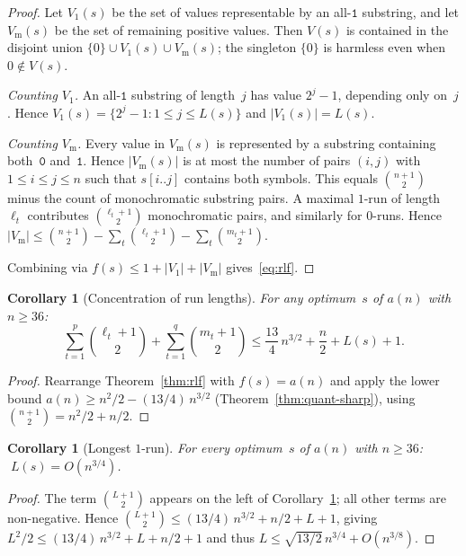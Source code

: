 \documentclass[11pt,a4paper]{article}
\theoremstyle{plain}
\newtheorem{corollary}[theorem]{Corollary}
\theoremstyle{definition}
\theoremstyle{remark}
\begin{document}
\begin{proof}
  Let $V_1(s)$ be the set of values representable by an
  all-$\mathtt{1}$ substring, and let $V_{\mathrm{m}}(s)$ be the set
  of remaining positive values.  Then $V(s)$ is contained in the
  disjoint union $\{0\} \cup V_1(s) \cup V_{\mathrm{m}}(s)$; the
  singleton $\{0\}$ is harmless even when $0 \notin V(s)$.

  \textit{Counting $V_1$.}
  An all-$\mathtt{1}$ substring of length~$j$ has value $2^j - 1$,
  depending only on~$j$.  Hence
  $V_1(s) = \{2^j - 1 : 1 \le j \le L(s)\}$ and
  $|V_1(s)| = L(s)$.

  \textit{Counting $V_{\mathrm{m}}$.}
  Every value in $V_{\mathrm{m}}(s)$ is represented by a substring
  containing both~$\mathtt{0}$ and~$\mathtt{1}$.  Hence
  $|V_{\mathrm{m}}(s)|$ is at most the number of pairs $(i,j)$ with
  $1 \le i \le j \le n$ such that $s[i..j]$ contains both symbols.
  This equals $\binom{n{+}1}{2}$ minus the count of monochromatic
  substring pairs.  A maximal $1$-run of length~$\ell_t$ contributes
  $\binom{\ell_t{+}1}{2}$ monochromatic pairs, and similarly for
  $0$-runs.  Hence
  $|V_{\mathrm{m}}| \le \binom{n{+}1}{2}
  - \sum_t \binom{\ell_t{+}1}{2} - \sum_t \binom{m_t{+}1}{2}$.

  Combining via $f(s) \le 1 + |V_1| + |V_{\mathrm{m}}|$
  gives~\eqref{eq:rlf}.
\end{proof}

\begin{corollary}[Concentration of run lengths]\label{cor:concentration}
  For any optimum~$s$ of $a(n)$ with $n \ge 36$:
  \[
    \sum_{t=1}^p \binom{\ell_t{+}1}{2}
    + \sum_{t=1}^q \binom{m_t{+}1}{2}
    \le \frac{13}{4}\,n^{3/2} + \frac{n}{2} + L(s) + 1.
  \]
\end{corollary}

\begin{proof}
  Rearrange Theorem~\ref{thm:rlf} with $f(s) = a(n)$ and apply the
  lower bound $a(n) \ge n^2/2 - (13/4)\,n^{3/2}$
  (Theorem~\ref{thm:quant-sharp}), using
  $\binom{n{+}1}{2} = n^2/2 + n/2$.
\end{proof}

\begin{corollary}[Longest $1$-run]\label{cor:Lbound}
  For every optimum~$s$ of $a(n)$ with $n \ge 36$:
  $\;L(s) = O(n^{3/4})$.
\end{corollary}

\begin{proof}
  The term $\binom{L{+}1}{2}$ appears on the left of
  Corollary~\ref{cor:concentration}; all other terms are non-negative.
  Hence $\binom{L{+}1}{2} \le (13/4)\,n^{3/2} + n/2 + L + 1$,
  giving $L^2/2 \le (13/4)\,n^{3/2} + L + n/2 + 1$ and thus
  $L \le \sqrt{13/2}\,n^{3/4} + O(n^{3/8})$.
\end{proof}
\end{document}
